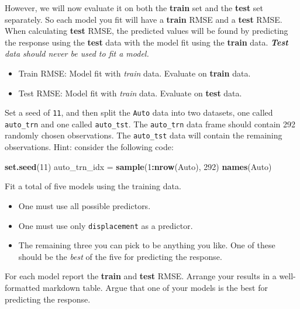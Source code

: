 \documentclass[
]{article}
\newenvironment{Shaded}{\begin{snugshade}}{\end{snugshade}}
\newcommand{\DecValTok}[1]{\textcolor[rgb]{0.00,0.00,0.81}{#1}}
\newcommand{\KeywordTok}[1]{\textcolor[rgb]{0.13,0.29,0.53}{\textbf{#1}}}
\newcommand{\NormalTok}[1]{#1}
\newcommand{\OperatorTok}[1]{\textcolor[rgb]{0.81,0.36,0.00}{\textbf{#1}}}
\newcommand{\StringTok}[1]{\textcolor[rgb]{0.31,0.60,0.02}{#1}}
\providecommand{\tightlist}{%
  \setlength{\itemsep}{0pt}\setlength{\parskip}{0pt}}
\begin{document}
However, we will now evaluate it on both the \textbf{train} set and the
\textbf{test} set separately. So each model you fit will have a
\textbf{train} RMSE and a \textbf{test} RMSE. When calculating
\textbf{test} RMSE, the predicted values will be found by predicting the
response using the \textbf{test} data with the model fit using the
\textbf{train} data. \emph{\textbf{Test} data should never be used to
fit a model.}

\begin{itemize}
\tightlist
\item
  Train RMSE: Model fit with \emph{train} data. Evaluate on
  \textbf{train} data.
\item
  Test RMSE: Model fit with \emph{train} data. Evaluate on \textbf{test}
  data.
\end{itemize}

Set a seed of \texttt{11}, and then split the \texttt{Auto} data into
two datasets, one called \texttt{auto\_trn} and one called
\texttt{auto\_tst}. The \texttt{auto\_trn} data frame should contain 292
randomly chosen observations. The \texttt{auto\_tst} data will contain
the remaining observations. Hint: consider the following code:

\begin{Shaded}
\begin{Highlighting}[]
\KeywordTok{set.seed}\NormalTok{(}\DecValTok{11}\NormalTok{)}
\NormalTok{auto_trn_idx =}\StringTok{ }\KeywordTok{sample}\NormalTok{(}\DecValTok{1}\OperatorTok{:}\KeywordTok{nrow}\NormalTok{(Auto), }\DecValTok{292}\NormalTok{)}
\KeywordTok{names}\NormalTok{(Auto)}
\end{Highlighting}
\end{Shaded}

Fit a total of five models using the training data.

\begin{itemize}
\tightlist
\item
  One must use all possible predictors.
\item
  One must use only \texttt{displacement} as a predictor.
\item
  The remaining three you can pick to be anything you like. One of these
  should be the \emph{best} of the five for predicting the response.
\end{itemize}

For each model report the \textbf{train} and \textbf{test} RMSE. Arrange
your results in a well-formatted markdown table. Argue that one of your
models is the best for predicting the response.
\end{document}
